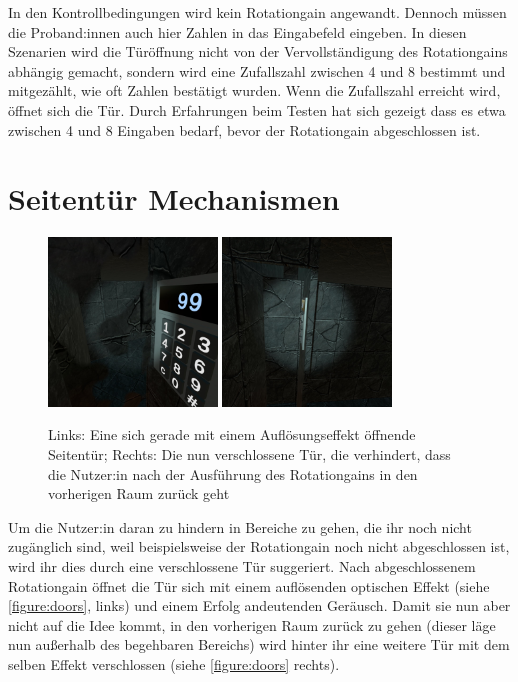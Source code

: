 In den Kontrollbedingungen wird kein Rotationgain angewandt. Dennoch müssen die Proband:innen auch hier Zahlen in das Eingabefeld eingeben. In diesen Szenarien wird die Türöffnung nicht von der Vervollständigung des Rotationgains abhängig gemacht, sondern wird eine Zufallszahl zwischen 4 und 8 bestimmt und mitgezählt, wie oft Zahlen bestätigt wurden. Wenn die Zufallszahl erreicht wird, öffnet sich die Tür. Durch Erfahrungen beim Testen hat sich gezeigt dass es etwa zwischen 4 und 8 Eingaben bedarf, bevor der Rotationgain abgeschlossen ist.

\section{Seitentür Mechanismen}
\begin{figure}[!h]
    \centering
    \includegraphics[width=0.4\textwidth]{vrscreenshots/dissolve.jpg}
    \includegraphics[width=0.4\textwidth]{vrscreenshots/reverseddoor.jpg}
    \caption{Links: Eine sich gerade mit einem Auflösungseffekt öffnende Seitentür; Rechts: Die nun verschlossene Tür, die verhindert, dass die Nutzer:in nach der Ausführung des Rotationgains in den vorherigen Raum zurück geht}\label{figure:doors}
\end{figure}

Um die Nutzer:in daran zu hindern in Bereiche zu gehen, die ihr noch nicht zugänglich sind, weil beispielsweise der Rotationgain noch nicht abgeschlossen ist, wird ihr dies durch eine verschlossene Tür suggeriert. Nach abgeschlossenem Rotationgain öffnet die Tür sich mit einem auflösenden optischen Effekt (siehe \autoref{figure:doors}, links) und einem Erfolg andeutenden Geräusch. Damit sie nun aber nicht auf die Idee kommt, in den vorherigen Raum zurück zu gehen (dieser läge nun außerhalb des begehbaren Bereichs) wird hinter ihr eine weitere Tür mit dem selben Effekt verschlossen (siehe \autoref{figure:doors} rechts).

